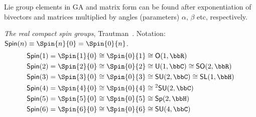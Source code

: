 \begin{example}
\begin{unit}
Lie group elements in GA and matrix form can be found after
exponentiation of bivectors and matrices multiplied by angles
(parameters) $\alpha$, $\beta$ etc, respectively.
\end{unit}
%

\begin{unit}\textit{The real compact spin groups},\label{spingroups}
Trautman~\cite{Trautman06}. Notation:
$\mathsf{Spin}(n)\equiv\Spin{n}{0}=\Spin{0}{n}$.
\[\begin{split}
&\mathsf{Spin}(1)=\Spin{1}{0}\cong\Spin{0}{1}\cong\mathsf{O}(1,\bbR)\\
&\mathsf{Spin}(2)=\Spin{2}{0}\cong\Spin{0}{2}\cong\mathsf{U}(1,\bbC)\cong\mathsf{SO}(2,\bbR)\\
&\mathsf{Spin}(3)=\Spin{3}{0}\cong\Spin{0}{3}\cong\mathsf{SU}(2,\bbC)\cong\mathsf{SL}(1,\bbH)\\
&\mathsf{Spin}(4)=\Spin{4}{0}\cong\Spin{0}{4}\cong{^2\mathsf{SU}(2,\bbC)}\\
&\mathsf{Spin}(5)=\Spin{5}{0}\cong\Spin{0}{5}\cong\mathsf{Sp}(2,\bbH)\\
&\mathsf{Spin}(6)=\Spin{6}{0}\cong\Spin{0}{6}\cong\mathsf{SU}(4,\bbC)\\
\end{split}\]
\end{unit}
 \vspace{2mm}



\end{example}
